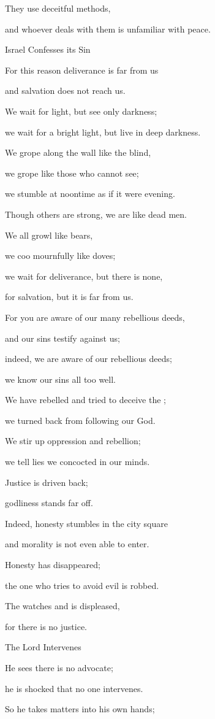 {\par }{\Q They use deceitful
methods,
\par }{\Q and whoever deals
with them
is unfamiliar
with peace.
\par }{\SH Israel Confesses its Sin
\par }{\Q {}For this
reason deliverance is far
from
us

\par }{\Q and salvation
does not
reach
us.
\par }{\Q We wait
for light,
but see
only darkness;
\par }{\Q we wait for a bright
light, but live in deep darkness.
\par }{\Q {}We grope
along the wall
like the blind,
\par }{\Q we grope
like those who cannot see;
\par }{\Q we stumble
at noontime
as if it were evening.
\par }{\Q Though others are strong,
we are like dead men.
\par }{\Q {}We all
growl
like bears,
\par }{\Q we coo
mournfully
like doves;
\par }{\Q we wait
for deliverance,
but there is none,
\par }{\Q for salvation,
but it is far
from us.
\par }{\Q {}For
you are aware
of our
many
rebellious
deeds,
\par }{\Q and our sins
testify
against us;
\par }{\Q indeed,
we are aware of our rebellious
deeds;
\par }{\Q we know
our sins
all too well.
\par }{\Q {}We have rebelled
and tried to deceive
the {};
\par }{\Q we turned back
from following
our God.
\par }{\Q We stir up oppression
and rebellion;
\par }{\Q we tell
lies
we concocted
in our minds.
\par }{\Q {}Justice
is driven
back;
\par }{\Q godliness
stands
far
off.
\par }{\Q Indeed,
honesty stumbles
in the city square
\par }{\Q and morality
is not
even able
to enter.
\par }{\Q {}Honesty
has disappeared;
\par }{\Q the one who tries
to avoid evil
is robbed.
\par }{\Q The
{}
watches
and is displeased,
\par }{\Q for
there is no
justice.
\par }{\SH The Lord Intervenes
\par }{\Q {}He sees
there is no
advocate;
\par }{\Q he is shocked
that
no
one intervenes.
\par }{\Q So he takes matters
into his
own hands;

}
